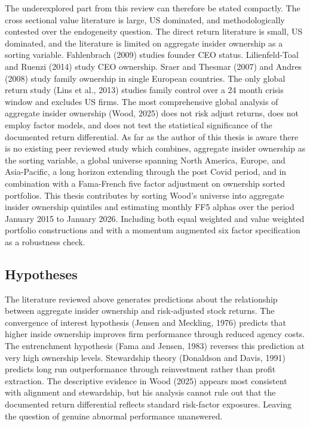 The underexplored part from this review can therefore be stated compactly. The cross sectional value literature is large, US dominated, and methodologically contested over the endogeneity question. The direct return literature is small, US dominated, and the literature is limited on aggregate insider ownership as a sorting variable. Fahlenbrach (2009) studies founder CEO status. Lilienfeld-Toal and Ruenzi (2014) study CEO ownership. Sraer and Thesmar (2007) and Andres (2008) study family ownership in single European countries. The only global return study (Lins et al., 2013) studies family control over a 24 month crisis window and excludes US firms. The most comprehensive global analysis of aggregate insider ownership (Wood, 2025) does not risk adjust returns, does not employ factor models, and does not test the statistical significance of the documented return differential. As far as the author of this thesis is aware there is no existing peer reviewed study which combines, aggregate insider ownership as the sorting variable, a global universe spanning North America, Europe, and Asia-Pacific, a long horizon extending through the post Covid period, and in combination with a Fama-French five factor adjustment on ownership sorted portfolios. This thesis contributes by sorting Wood's universe into aggregate insider ownership quintiles and estimating monthly FF5 alphas over the period January 2015 to January 2026. Including both equal weighted and value weighted portfolio constructions and with a momentum augmented six factor specification as a robustness check.


\subsection{Hypotheses}

The literature reviewed above generates predictions about the relationship between aggregate insider ownership and risk-adjusted stock returns. The convergence of interest hypothesis (Jensen and Meckling, 1976) predicts that higher inside ownership improves firm performance through reduced agency costs. The entrenchment hypothesis (Fama and Jensen, 1983) reverses this prediction at very high ownership levels. Stewardship theory (Donaldson and Davis, 1991) predicts long run outperformance through reinvestment rather than profit extraction. The descriptive evidence in Wood (2025) appears most consistent with alignment and stewardship, but his analysis cannot rule out that the documented return differential reflects standard risk-factor exposures. Leaving the question of genuine abnormal performance unanswered.

